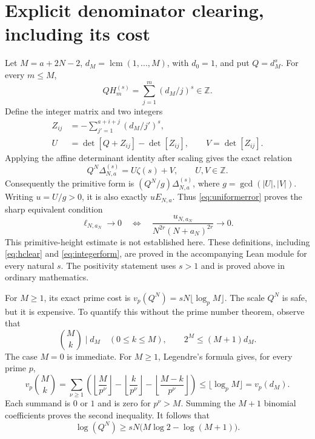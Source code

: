 \documentclass[11pt]{article}
\newcommand{\HH}[2]{H_{#1}^{(#2)}}
\newcommand{\lcm}{\operatorname{lcm}}
\newcommand{\Z}{\mathbb Z}
\begin{document}
\section{Explicit denominator clearing, including its cost}
Let $M=a+2N-2$, $d_M=\lcm(1,\ldots,M)$, with $d_0=1$, and put
$Q=d_M^s$. For every $m\le M$,
\begin{equation}
 Q\HH{m}{s}
 =\sum_{j=1}^m(d_M/j)^s\in\Z .
 \label{eq:hclear}
\end{equation}
Define the integer matrix and two integers
\begin{align}
 Z_{ij}&=-\sum_{j'=1}^{a+i+j}(d_M/j')^s,\\
 U&=\det[Q+Z_{ij}]-\det[Z_{ij}],\qquad
 V=\det[Z_{ij}].
 \label{eq:integers}
\end{align}
Applying the affine determinant identity after scaling gives the exact relation
\begin{equation}
 \boxed{Q^N\Delta_{N,a}^{(s)}=U\zeta(s)+V,\qquad U,V\in\Z.}
 \label{eq:integerform}
\end{equation}
Consequently the primitive form is
$(Q^N/g)\Delta_{N,a}^{(s)}$, where $g=\gcd(|U|,|V|)$.
Writing $u=U/g>0$, it is also exactly $uE_{N,a}$. Thus
\eqref{eq:uniformerror} proves the sharp equivalent condition
\begin{equation}
 \ell_{N,a_N}\to0\quad\Longleftrightarrow\quad
 \frac{u_{N,a_N}}{N^{2r}(N+a_N)^{2r}}\to0.
 \label{eq:heightcondition}
\end{equation}
This primitive-height estimate is not established here.
These definitions, including \eqref{eq:hclear} and \eqref{eq:integerform},
are proved in the accompanying Lean module for every natural $s$.
The positivity statement uses $s>1$ and is proved above in ordinary mathematics.

For $M\ge1$, its exact prime cost is $v_p(Q^N)=sN\lfloor\log_p M\rfloor$.
The scale $Q^N$ is safe, but it is expensive. To quantify this without the
prime number theorem, observe that
\begin{equation}
 \binom{M}{k}\mid d_M\quad(0\le k\le M),\qquad
 2^M\le(M+1)d_M .
 \label{eq:lcm}
\end{equation}
The case $M=0$ is immediate. For $M\ge1$, Legendre's formula gives, for every prime $p$,
\[
 v_p\binom{M}{k}
 =\sum_{\nu\ge1}
 \left(\left\lfloor\frac M{p^\nu}\right\rfloor
 -\left\lfloor\frac k{p^\nu}\right\rfloor
 -\left\lfloor\frac{M-k}{p^\nu}\right\rfloor\right)
 \le\lfloor\log_p M\rfloor=v_p(d_M).
\]
Each summand is $0$ or $1$ and is zero for $p^\nu>M$.
Summing the $M+1$ binomial coefficients proves the second inequality.
It follows that
\begin{equation}
 \log(Q^N)\ge sN\bigl(M\log2-\log(M+1)\bigr).
 \label{eq:cost}
\end{equation}
\end{document}
